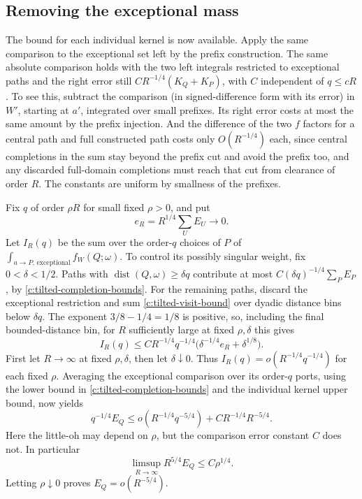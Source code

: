 \subsection{Removing the exceptional mass}\label{c:tilted-exceptional}
The bound for each individual kernel is now available. Apply the same
comparison to the exceptional set left by the prefix construction.
The same absolute comparison holds with the two left integrals restricted to exceptional paths and the right error still \(C R^{-1/4}(K_Q+K_P)\), with \(C\) independent of \(q\le cR\). To see this, subtract the comparison (in signed-difference form with its error) in \(W'\), starting at \(a'\), integrated over small prefixes. Its right error costs at most the same amount by the prefix injection. And the difference of the two \(f\) factors for a central path and full constructed path costs only \(O(R^{-1/4})\) each, since central completions in the sum stay beyond the prefix cut and avoid the prefix too, and any discarded full-domain completions must reach that cut from clearance of order \(R\). The constants are uniform by smallness of the prefixes.



Fix \(q\) of order \(\rho R\) for small fixed \(\rho>0\), and put
\[
 e_R=R^{1/4}\sum_U E_U\longrightarrow0.
\]
Let \(I_R(q)\) be the sum over the order-\(q\) choices of \(P\) of
\(\int_{a\to P,\,\mathrm{exceptional}}f_W(Q;\omega)\).
To control its possibly singular weight, fix \(0<\delta<1/2\).
Paths with \(\operatorname{dist}(Q,\omega)\ge\delta q\) contribute at
most \(C(\delta q)^{-1/4}\sum_P E_P\), by
\eqref{c:tilted-completion-bounds}. For the remaining paths, discard
the exceptional restriction and sum
\eqref{c:tilted-visit-bound} over dyadic distance bins below \(\delta q\).
The exponent \(3/8-1/4=1/8\) is positive, so, including the final
bounded-distance bin, for \(R\) sufficiently large at fixed
\(\rho,\delta\) this gives
\[
 I_R(q)\le C R^{-1/4}q^{-1/4}
       \bigl(\delta^{-1/4}e_R+\delta^{1/8}\bigr).
\]
First let \(R\to\infty\) at fixed \(\rho,\delta\), then let
\(\delta\downarrow0\). Thus \(I_R(q)=o(R^{-1/4}q^{-1/4})\) for
each fixed \(\rho\). Averaging the exceptional comparison over its
order-\(q\) ports, using the lower bound in
\eqref{c:tilted-completion-bounds} and the individual kernel upper
bound, now yields
\[
 q^{-1/4} E_Q \le o(R^{-1/4}q^{-5/4})+C R^{-1/4} R^{-5/4}.
\]
Here the little-oh may depend on \(\rho\), but the comparison error
constant \(C\) does not. In particular
\[
 \limsup_{R\to\infty}R^{5/4}E_Q\le C\rho^{1/4}.
\]
Letting \(\rho\downarrow0\) proves \(E_Q=o(R^{-5/4})\).



